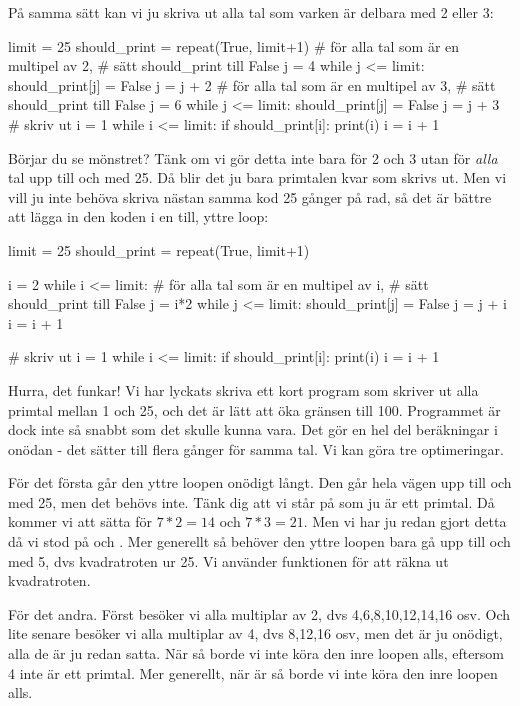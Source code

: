 På samma sätt kan vi ju skriva ut alla tal som varken är delbara med 2 eller 3:
\vspace{10pt}

\begin{python}
limit = 25
should_print = repeat(True, limit+1)
# för alla tal som är en multipel av 2,
# sätt should_print till False
j = 4
while j <= limit:
	should_print[j] = False
	j = j + 2
# för alla tal som är en multipel av 3,
# sätt should_print till False
j = 6
while j <= limit:
    should_print[j] = False
    j = j + 3
# skriv ut
i = 1
while i <= limit:
	if should_print[i]:
		print(i)
	i = i + 1
\end{python}
\newpage
Börjar du se mönstret? Tänk om vi gör detta inte bara för 2 och 3 utan för \emph{alla} tal upp till och med 25. Då blir det ju bara primtalen kvar som skrivs ut. Men vi vill ju inte behöva skriva nästan samma kod 25 gånger på rad, så det är bättre att lägga in den koden i en till, yttre loop:
\vspace{10pt}

\begin{python}
limit = 25
should_print = repeat(True, limit+1)

i = 2
while i <= limit:
	# för alla tal som är en multipel av i,
	# sätt should_print till False
	j = i*2
	while j <= limit:
		should_print[j] = False
		j = j + i
	i = i + 1

# skriv ut
i = 1
while i <= limit:
	if should_print[i]:
		print(i)
	i = i + 1
\end{python}

Hurra, det funkar! Vi har lyckats skriva ett kort program som skriver ut alla primtal mellan 1 och 25, och det är lätt att öka gränsen till 100. Programmet är dock inte så snabbt som det skulle kunna vara. Det gör en hel del beräkningar i onödan - det sätter  till  flera gånger för samma tal. Vi kan göra tre optimeringar.

För det första går den yttre loopen onödigt långt. Den går hela vägen upp till och med 25, men det behövs inte. Tänk dig att vi står på  som ju är ett primtal. Då kommer vi att sätta  för $7*2=14$ och $7*3=21$. Men vi har ju redan gjort detta då vi stod på  och . Mer generellt så behöver den yttre loopen bara gå upp till och med 5, dvs kvadratroten ur 25. Vi använder funktionen  för att räkna ut kvadratroten.

För det andra. Först besöker vi alla multiplar av 2, dvs 4,6,8,10,12,14,16 osv. Och lite senare besöker vi alla multiplar av 4, dvs 8,12,16 osv, men det är ju onödigt, alla de är ju redan satta. När  så borde vi inte köra den inre loopen alls, eftersom 4 inte är ett primtal. Mer generellt, när  är  så borde vi inte köra den inre loopen alls.

